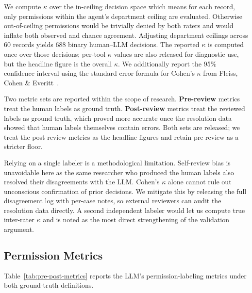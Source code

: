 \documentclass{article}
\theoremstyle{plain}
\theoremstyle{definition}
\theoremstyle{remark}
\begin{document}
We compute $\kappa$ over the in-ceiling decision space which means for 
each record, only permissions within the agent's department ceiling 
are evaluated. Otherwise out-of-ceiling permissions would be trivially 
denied by both raters and would inflate both observed and chance 
agreement. Adjusting department ceilings across 60 records yields 688 
binary human--LLM decisions. The reported $\kappa$ is computed once 
over those decisions; per-tool $\kappa$ values are also released for 
diagnostic use, but the headline figure is the overall $\kappa$. We 
additionally report the 95\% confidence interval using the standard 
error formula for Cohen's $\kappa$ from Fleiss, Cohen \& 
Everitt~\citep{fleiss1969kappa}.

Two metric sets are reported within the scope of research. \textbf{Pre-review} 
metrics treat the human labels as ground truth. \textbf{Post-review} 
metrics treat the reviewed labels as ground truth, which proved more accurate once the resolution data showed that human labels 
themselves contain errors. Both sets are released; we treat the 
post-review metrics as the headline figures and retain pre-review as 
a stricter floor.

Relying on a single labeler is a methodological limitation. Self-review bias is unavoidable here as the same 
researcher who produced the human labels also resolved their 
disagreements with the LLM. Cohen's $\kappa$ alone cannot rule out 
unconscious confirmation of prior decisions. We mitigate this by 
releasing the full disagreement log with per-case notes, so external 
reviewers can audit the resolution data directly. A second independent 
labeler would let us compute true inter-rater $\kappa$ and is noted 
as the most direct strengthening of the validation argument.

\subsection{Permission Metrics}
Table~\ref{tab:pre-post-metrics} reports the LLM's permission-labeling metrics 
under both ground-truth definitions.
\end{document}

